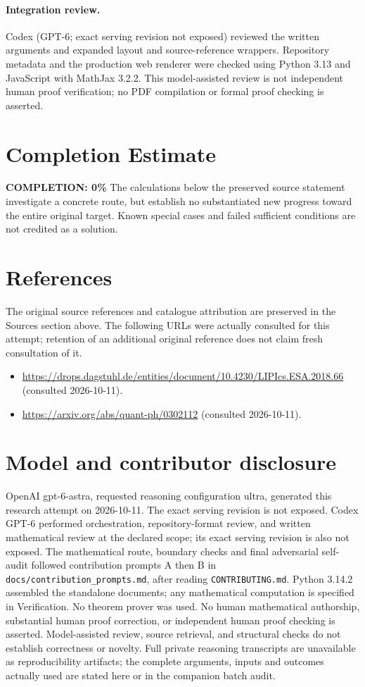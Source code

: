 \documentclass[11pt]{article}
\begin{document}
\paragraph{Integration review.} Codex (GPT-6; exact serving revision not exposed) reviewed the written arguments and expanded layout and source-reference wrappers. Repository metadata and the production web renderer were checked using Python 3.13 and JavaScript with MathJax 3.2.2. This model-assisted review is not independent human proof verification; no PDF compilation or formal proof checking is asserted.

\section{Completion Estimate}
\noindent\textbf{COMPLETION: 0\%}
The calculations below the preserved source statement investigate a concrete route,
but establish no substantiated new progress toward the entire original target.
Known special cases and failed sufficient conditions are not credited as a solution.
\section{References}
The original source references and catalogue attribution are preserved in the
Sources section above. The following URLs were actually consulted for this attempt;
retention of an additional original reference does not claim fresh consultation of it.
\begin{itemize}
\item \url{https://drops.dagstuhl.de/entities/document/10.4230/LIPIcs.ESA.2018.66} (consulted 2026-10-11). 
\item \url{https://arxiv.org/abs/quant-ph/0302112} (consulted 2026-10-11). 
\end{itemize}
\section{Model and contributor disclosure}
OpenAI gpt-6-astra, requested reasoning configuration ultra, generated this research
attempt on 2026-10-11. The exact serving revision is not exposed. Codex GPT-6
performed orchestration, repository-format review, and written mathematical review at the declared scope; its exact serving revision
is also not exposed. The mathematical route, boundary checks and final adversarial
self-audit followed contribution prompts A then B in
\texttt{docs/contribution\_prompts.md}, after reading \texttt{CONTRIBUTING.md}.
Python 3.14.2 assembled the standalone documents; any mathematical computation is
specified in Verification. No theorem prover was used. No human mathematical
authorship, substantial human proof correction, or independent human proof checking
is asserted. Model-assisted review, source retrieval, and structural checks do not
establish correctness or novelty. Full private reasoning transcripts are unavailable
as reproducibility artifacts; the complete arguments, inputs and outcomes actually
used are stated here or in the companion batch audit.
\end{document}
